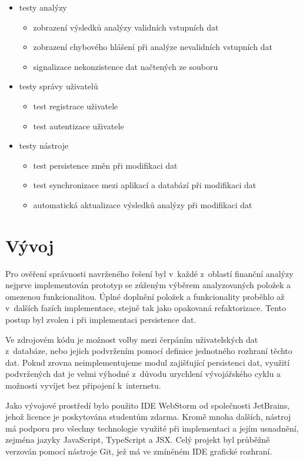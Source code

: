 \begin{itemize}
  \item testy analýzy
  \begin{itemize}
    \item zobrazení výsledků analýzy validních vstupních dat
    \item zobrazení chybového hlášení při analýze nevalidních vstupních dat
    \item signalizace nekonzistence dat načtených ze souboru
  \end{itemize}
  \item testy správy uživatelů
  \begin{itemize}
    \item{test registrace uživatele}
    \item{test autentizace uživatele}
  \end{itemize} 
  \item testy nástroje
  \begin{itemize}
    \item{test persistence změn při modifikaci dat}
    \item{test synchronizace mezi aplikací a databází při modifikaci dat}
    \item{automatická aktualizace výsledků analýzy při modifikaci dat}
  \end{itemize}
\end{itemize}


\section{Vývoj}
Pro ověření správnosti navrženého řešení byl v~každé z~oblastí finanční analýzy nejprve implementován prototyp se zúženým výběrem analyzovaných položek a omezenou funkcionalitou. Úplné doplnění položek a funkcionality proběhlo až v~dalších fazích implementace, stejně tak jako opakovaná refaktorizace. Tento postup byl zvolen i při implementaci persistence dat. 

Ve zdrojovém kódu je možnost volby mezi čerpáním uživatelských dat z~databáze, nebo jejich podvržením pomocí definice jednotného rozhraní těchto dat. Pokud zrovna neimplementujeme modul zajišťující persistenci dat, využití podvržených dat je velmi výhodné z~důvodu urychlení vývojářského cyklu a možnosti vyvíjet bez připojení k~internetu.

Jako vývojové prostředí bylo použito IDE WebStorm od společnosti JetBrains, jehož licence je poskytována studentům zdarma. Kromě mnoha dalších, nástroj má podporu pro všechny technologie využité při implementaci a jejím usnadnění, zejména jazyky JavaScript, TypeScript a JSX. Celý projekt byl průběžně verzován pomocí nástroje Git, jež má ve zmíněném IDE grafické rozhraní.

